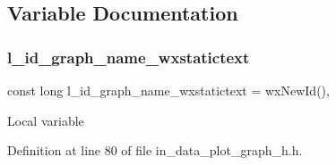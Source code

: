\subsection{Variable Documentation}
\mbox{\label{group___data__plot_gaa0c0b5c3fc3fe79d6300b2bc140c5283}} 
\subsubsection{l\_id\_graph\_name\_wxstatictext}
{\footnotesize\ttfamily const long l\+\_\+id\+\_\+graph\+\_\+name\+\_\+wxstatictext = wx\+New\+Id()\hspace{0.3cm}{\ttfamily [static]}, {\ttfamily [protected]}}

Local variable 

Definition at line 80 of file in\+\_\+data\+\_\+plot\+\_\+graph\+\_\+h.\+h.

